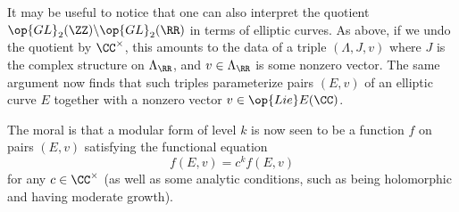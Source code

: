 \documentclass[../notes.tex]{subfiles}
\begin{document}
\begin{remark}
	It may be useful to notice that one can also interpret the quotient $\op{GL}_2(\ZZ)\backslash\op{GL}_2(\RR)$ in terms of elliptic curves. As above, if we undo the quotient by $\CC^\times$, this amounts to the data of a triple $(\Lambda,J,v)$ where $J$ is the complex structure on $\Lambda_\RR$, and $v\in\Lambda_\RR$ is some nonzero vector. The same argument now finds that such triples parameterize pairs $(E,v)$ of an elliptic curve $E$ together with a nonzero vector $v\in\op{Lie}E(\CC)$.
\end{remark}
The moral is that a modular form of level $k$ is now seen to be a function $f$ on pairs $(E,v)$ satisfying the functional equation
\[f(E,v)=c^kf(E,v)\]
for any $c\in\CC^\times$ (as well as some analytic conditions, such as being holomorphic and having moderate growth).
\end{document}
